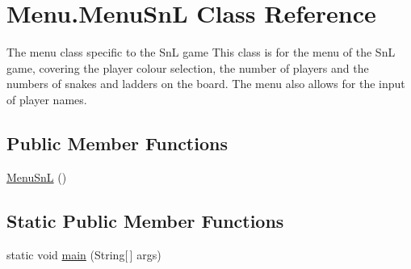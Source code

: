 \hypertarget{class_menu_1_1_menu_sn_l}{}\section{Menu.\+Menu\+Sn\+L Class Reference}
\label{class_menu_1_1_menu_sn_l}


The menu class specific to the Sn\+L game This class is for the menu of the Sn\+L game, covering the player colour selection, the number of players and the numbers of snakes and ladders on the board. The menu also allows for the input of player names.  


\subsection*{Public Member Functions}
\begin{DoxyCompactItemize}
\item 
\hyperlink{class_menu_1_1_menu_sn_l_a39167b25cf1ab4be1f66b6a327635e7b}{Menu\+Sn\+L} ()
\end{DoxyCompactItemize}
\subsection*{Static Public Member Functions}
\begin{DoxyCompactItemize}
\item 
static void \hyperlink{class_menu_1_1_menu_sn_l_af94b678ab820b841c5d39e683a7e26c5}{main} (String\mbox{[}$\,$\mbox{]} args)
\end{DoxyCompactItemize}
